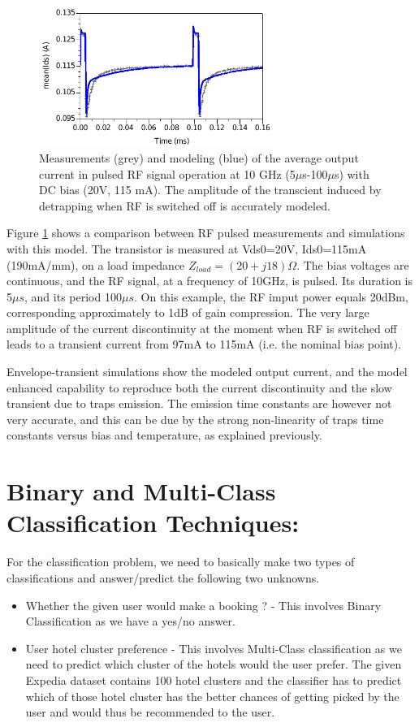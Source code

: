 \documentclass[conference]{IEEEtran}
\begin{document}
\begin{figure}[ht!] %
\centering
\includegraphics[width=3.0in]{Compare_pulse.pdf}
\caption{Measurements (grey) and modeling (blue) of the average output current in pulsed RF signal operation at 10 GHz (5$\mu$s-100$\mu$s) with DC bias (20V, 115 mA). The amplitude of the transcient induced by detrapping when RF is switched off is accurately modeled.}
\label{Compare_pulse}
\end{figure}

Figure \ref{Compare_pulse} shows a comparison between RF pulsed measurements and simulations with this model. The transistor is measured at Vds0=20V, Ids0=115mA (190mA/mm), on a load impedance $Z_{load}=\left(20+j18\right)\Omega$. The bias voltages are continuous, and the RF signal, at a frequency of 10GHz, is pulsed. Its duration is 5$\mu s$, and its period 100$\mu s$. On this example, the RF imput power equals 20dBm, corresponding approximately to 1dB of gain compression. The very large amplitude of the current discontinuity at the moment when RF is switched off leads to a transient current from 97mA to 115mA (i.e. the nominal bias point). 

Envelope-transient simulations show the modeled output current, and the model enhanced capability to reproduce both the current discontinuity and the slow transient due to traps emission. The emission time constants are however not very accurate, and this can be due by the strong non-linearity of traps time constants versus bias and temperature, as explained previously.



\section{\textbf{Binary and Multi-Class Classification Techniques:}}
For the classification problem, we need to basically make two types of classifications and answer/predict the following two unknowns.
\begin{itemize}
\item Whether the given user would make a booking ? - This involves Binary Classification as we have a yes/no answer.
\item User hotel cluster preference - This involves Multi-Class classification as we need to predict which cluster of the hotels would the user prefer. The given Expedia dataset contains 100 hotel clusters and the classifier has to predict which of those hotel cluster has the better chances of getting picked by the user and would thus be recommended to the user.
\end{itemize}
\end{document}
